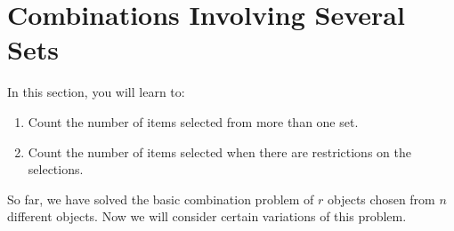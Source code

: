 \section{Combinations Involving Several Sets}

In this section, you will learn to:
\begin{enumerate}
    \item Count the number of items selected from more than one set.
    \item Count the number of items selected when there are restrictions on the selections.
\end{enumerate}

So far, we have solved the basic combination problem of \( r \) objects chosen from \( n \) different objects. Now we will consider certain variations of this problem.


